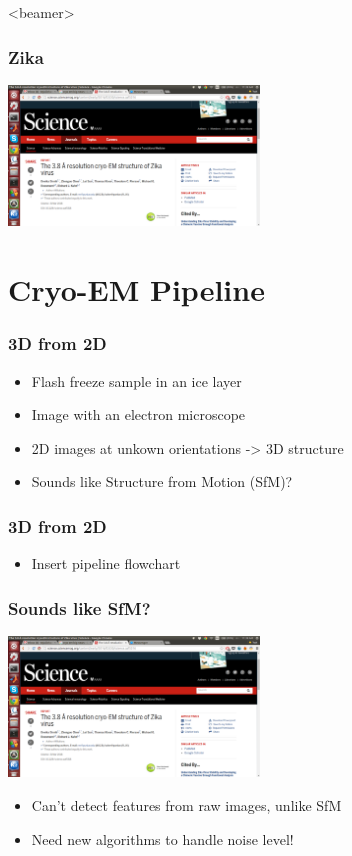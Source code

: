 \documentclass{beamer}
\begin{document}
\begin{frame}<beamer>
\frametitle{Zika}
\includegraphics[width=0.5\textwidth]{zika.png}%
\end{frame}

\section{Cryo-EM Pipeline}
\begin{frame}
\frametitle{3D from 2D}
\begin{itemize}
 \item Flash freeze sample in an ice layer
 \item Image with an electron microscope
 \item 2D images at unkown orientations -> 3D structure
 \item Sounds like Structure from Motion (SfM)?
\end{itemize}
\end{frame}

\begin{frame}
\frametitle{3D from 2D}
\begin{itemize}
 \item Insert pipeline flowchart
\end{itemize}
\end{frame}

\begin{frame}
\frametitle{Sounds like SfM?}
\includegraphics[width=0.5\textwidth]{zika.png}%
\begin{itemize}
  \item Can't detect features from raw images, unlike SfM
 \item Need new algorithms to handle noise level!
\end{itemize}
\end{frame}
\end{document}
